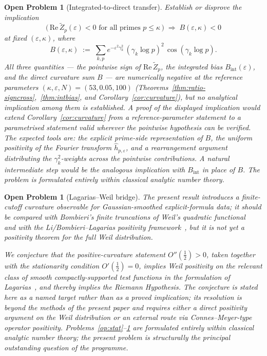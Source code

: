 \documentclass[11pt]{article}
\newtheorem{openproblem}[theorem]{Open Problem}
\newcommand{\Zt}{\widetilde{Z}}
\begin{document}
\begin{openproblem}[Integrated-to-direct transfer]\label{op:transfer}
\label{op:transfer}
Establish or disprove the implication
\[
\bigl(\,\mathrm{Re}\,\Zt_p(\varepsilon)<0 \text{ for all primes }
p\le\kappa\,\bigr)
\;\Longrightarrow\;
B(\varepsilon,\kappa)<0
\]
at fixed $(\varepsilon,\kappa)$, where
\[
B(\varepsilon,\kappa) \;:=\; \sum_{k,p} e^{-\varepsilon^2\gamma_k^2}\,
(\gamma_k\log p)^2\,\cos(\gamma_k\log p).
\]
All three quantities --- the pointwise sign of
$\mathrm{Re}\,\Zt_p$, the integrated bias $B_{\mathrm{int}}(\varepsilon)$,
and the direct curvature sum $B$ --- are numerically negative at the
reference parameters $(\kappa,\varepsilon,N)=(53,0.05,100)$
(Theorems~\ref{thm:ratio-signcross},~\ref{thm:intbias}, and
Corollary~\ref{cor:curvature}), but no analytical implication among
them is established.
A proof of the displayed implication would extend
Corollary~\ref{cor:curvature} from a reference-parameter statement to
a parametrised statement valid wherever the pointwise hypothesis can
be verified.
The expected tools are: the explicit prime-side representation of $B$,
the uniform positivity of the Fourier transform
$\widehat{h}_{p,\varepsilon}$, and a rearrangement argument
distributing the $\gamma_k^2$-weights across the pointwise
contributions.
A natural intermediate step would be the analogous implication with
$B_{\mathrm{int}}$ in place of $B$.
The problem is formulated entirely within classical analytic number theory.
\end{openproblem}

\begin{openproblem}[Lagarias--Weil bridge]\label{op:weil}
\label{op:weil-bridge}
The present result introduces a finite-cutoff curvature observable
for Gaussian-smoothed explicit-formula data; it should be compared
with Bombieri's finite truncations of Weil's quadratic
functional~\cite{Bombieri} and with the Li/Bombieri--Lagarias
positivity framework~\cite{Li,BombieriLagarias}, but it is not yet a
positivity theorem for the full Weil distribution.

We conjecture that the positive-curvature statement
$O''(\tfrac12)>0$, taken together with the stationarity condition
$O'(\tfrac12)=0$, implies Weil positivity on the relevant class of
smooth compactly-supported test functions in the formulation of
Lagarias~\cite{Lagarias}, and thereby implies the Riemann Hypothesis.
The conjecture is stated here as a named target rather than as a
proved implication; its resolution is beyond the methods of the
present paper and requires either a direct positivity argument on the
Weil distribution or an external route via Connes--Meyer-type operator
positivity.
Problems~\ref{op:stat}--\ref{op:transfer} are formulated entirely within
classical analytic number theory; the present problem is structurally
the principal outstanding question of the programme.
\end{openproblem}
\end{document}
